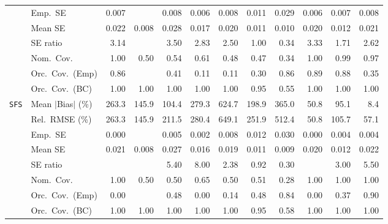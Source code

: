 \begin{landscape}
\begin{longtable}{llrrrrrrrrrr}
 & Emp.\ SE & 0.007 &  & 0.008 & 0.006 & 0.008 & 0.011 & 0.029 & 0.006 & 0.007 & 0.008 \\
 & Mean SE & 0.022 & 0.008 & 0.028 & 0.017 & 0.020 & 0.011 & 0.010 & 0.020 & 0.012 & 0.021 \\
 & SE ratio & 3.14 &  & 3.50 & 2.83 & 2.50 & \cellcolor{rankone}1.00 & \cellcolor{ranktwo}0.34 & 3.33 & \cellcolor{rankthree}1.71 & 2.62 \\
 & Nom.\ Cov. & \cellcolor{rankthree}1.00 & 0.50 & 0.54 & 0.61 & 0.48 & 0.47 & 0.34 & \cellcolor{rankthree}1.00 & \cellcolor{ranktwo}0.99 & \cellcolor{rankone}0.97 \\
 & Orc.\ Cov.\ (Emp) & \cellcolor{rankthree}0.86 &  & 0.41 & 0.11 & 0.11 & 0.30 & \cellcolor{rankthree}0.86 & \cellcolor{rankone}0.89 & \cellcolor{ranktwo}0.88 & 0.35 \\
 & Orc.\ Cov.\ (BC) & \cellcolor{ranktwo}1.00 & \cellcolor{ranktwo}1.00 & \cellcolor{ranktwo}1.00 & \cellcolor{ranktwo}1.00 & \cellcolor{ranktwo}1.00 & \cellcolor{rankone}0.95 & \cellcolor{rankthree}0.55 & \cellcolor{ranktwo}1.00 & \cellcolor{ranktwo}1.00 & \cellcolor{ranktwo}1.00 \\
\addlinespace[2pt]
\quad \texttt{SFS} & Mean $|$Bias$|$ (\%) & 263.3 & 145.9 & 104.4 & 279.3 & 624.7 & 198.9 & 365.0 & \cellcolor{ranktwo}50.8 & \cellcolor{rankthree}95.1 & \cellcolor{rankone}8.4 \\
 & Rel.\ RMSE (\%) & 263.3 & 145.9 & 211.5 & 280.4 & 649.1 & 251.9 & 512.4 & \cellcolor{rankone}50.8 & \cellcolor{rankthree}105.7 & \cellcolor{ranktwo}57.1 \\
 & Emp.\ SE & 0.000 &  & 0.005 & 0.002 & 0.008 & 0.012 & 0.030 & 0.000 & 0.004 & 0.004 \\
 & Mean SE & 0.021 & 0.008 & 0.027 & 0.016 & 0.019 & 0.011 & 0.009 & 0.020 & 0.012 & 0.022 \\
 & SE ratio &  &  & 5.40 & 8.00 & \cellcolor{rankthree}2.38 & \cellcolor{rankone}0.92 & \cellcolor{ranktwo}0.30 &  & 3.00 & 5.50 \\
 & Nom.\ Cov. & \cellcolor{rankone}1.00 & 0.50 & 0.50 & \cellcolor{ranktwo}0.65 & 0.50 & \cellcolor{rankthree}0.51 & 0.28 & \cellcolor{rankone}1.00 & \cellcolor{rankone}1.00 & \cellcolor{rankone}1.00 \\
 & Orc.\ Cov.\ (Emp) & 0.00 &  & \cellcolor{rankthree}0.48 & 0.00 & 0.14 & \cellcolor{rankthree}0.48 & \cellcolor{ranktwo}0.84 & 0.00 & 0.37 & \cellcolor{rankone}0.90 \\
 & Orc.\ Cov.\ (BC) & \cellcolor{ranktwo}1.00 & \cellcolor{ranktwo}1.00 & \cellcolor{ranktwo}1.00 & \cellcolor{ranktwo}1.00 & \cellcolor{ranktwo}1.00 & \cellcolor{rankone}0.95 & \cellcolor{rankthree}0.58 & \cellcolor{ranktwo}1.00 & \cellcolor{ranktwo}1.00 & \cellcolor{ranktwo}1.00 \\

\end{longtable}
\end{landscape}
